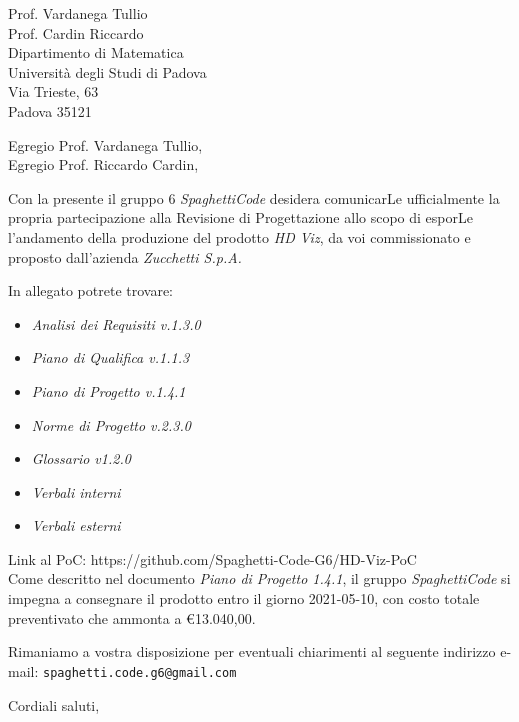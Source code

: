 \documentclass[a4paper,12pt]{letteracdp}
\date{10 marzo 2021}
\begin{document}
\begin{letter}{
		\vspace*{-2\baselineskip}
		Prof. Vardanega Tullio \\
		Prof. Cardin Riccardo \\
		Dipartimento di Matematica \\
		Università degli Studi di Padova \\
		Via Trieste, 63 \\
		Padova 35121}

	\opening{Egregio Prof. Vardanega Tullio, \\
	\noindent Egregio Prof. Riccardo Cardin,}

	\begin{flushleft}
		Con la presente il gruppo 6 \textit{SpaghettiCode} desidera comunicarLe ufficialmente la propria partecipazione alla Revisione di Progettazione allo scopo di esporLe l'andamento della produzione del prodotto 
        \textit{HD Viz}, da voi commissionato e proposto dall'azienda \textit{Zucchetti S.p.A.}
        
		In allegato potrete trovare:
	\end{flushleft}

	\begin{itemize}
		\item \emph{Analisi dei Requisiti v.1.3.0}
		\item \emph{Piano di Qualifica v.1.1.3}
		\item \emph{Piano di Progetto v.1.4.1}
		\item \emph{Norme di Progetto v.2.3.0}
		\item \emph{Glossario v1.2.0}
		\item \emph{Verbali interni}
		\item \emph{Verbali esterni}
	\end{itemize}
	
	\begin{flushleft}
		Link al PoC: https://github.com/Spaghetti-Code-G6/HD-Viz-PoC \\
		Come descritto nel documento \emph{Piano di Progetto 1.4.1}, il gruppo \textit{SpaghettiCode} si impegna a consegnare il prodotto entro il giorno 2021-05-10, con costo totale preventivato che ammonta a \euro{13.040,00}.

		Rimaniamo a vostra disposizione per eventuali chiarimenti al seguente indirizzo e-mail: {\texttt{spaghetti.code.g6@gmail.com}}
	\end{flushleft}

	\closing{Cordiali saluti,}

\end{letter}
\end{document}

